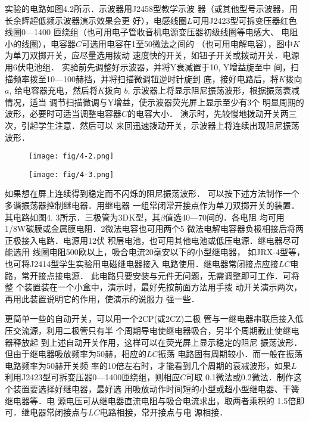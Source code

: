 实验的电路如图4.2所示．示波器用J2458型教学示波
器（或其他型号示波器，用长余辉超低频示波器演示效果会更
好），电感线圈$L$可用J2423型可拆变压器红色线圈0—1400
匝绕组（也可用电子管收音机电源变压器初级线圈等电感大、
电阻小的线圈），电容器$C$可选用电容在1至50微法之间的
（也可用电解电容），图中$K$为单刀双掷开关，应尽量选用拨动
速度快的开关，如钮子开关或拨动开关．电源用6伏电池组．
实验前先调整好示波器，并将Y衰减置于10, Y增益旋至中
间，扫描频率拨至10—100赫挡，并将扫描微调钮逆时针旋到
底，接好电路后，将$K$拨向$a$, 给电容器充电，然后将$K$拨向
$b$, 示波器上将显示阻尼振荡波形，根据振荡衰减情况，适当
调节扫描微调与Y增益，使示波器荧光屏上显示至少有3个
明显周期的波形，必要时可适当调整电容器$C$的电容大小．
演示时，先较慢地拨动开关两三次，引起学生注意．然后可以
来回迅速拨动开关，示波器上将连续出现阻尼振荡波形．

\begin{figure}[htp]\centering
    \begin{minipage}[t]{0.48\textwidth}
    \centering
\texttt{[image: fig/4-2.png]}
    \caption{}
    \end{minipage}
    \begin{minipage}[t]{0.48\textwidth}
    \centering
\texttt{[image: fig/4-3.png]}
    \caption{}
    \end{minipage}
    \end{figure}

如果想在屏上连续得到稳定而不闪烁的阻尼振荡波形．
可以按下述方法制作一个多谐振荡器控制继电器．用继电器
一组常闭常开接点作为单刀双掷开关的装置．其电路如图4.
3所示．三极管为3DK型，其$\beta$值选40—70间的．各电阻
均可用1/8W碳膜或金属膜电阻．2微法电容也可用两个5
微法电解电容器负极相接后将两正极接入电路．电源用12伏
积层电池，也可用其他电池或低压电源．继电器尽可能选用
线圈电阻500欧以上，吸合电流20毫安以下的小型继电器，
如JRX-4型等，也可将J2414型学生实验用电磁继电器接入
电路使用．继电器常闭接点应接$LC$电路，常开接点接电源．
此电路只要安装与元件无问题，无需调整即可工作．可将整
个装置装在一个小盒中，演示时，最好先按前面方法用手拨
动开关演示两次，再用此装置说明它的作用，使演示的说服力
强一些．

更简单一些的自动开关，可以用一个2CP(或2CZ)二极
管与一继电器串联后接入低压交流源，利用二极管只有半
个周期导电使继电器吸合，另半个周期截止使继电器释放起
到上述自动开关作用，这样可以在荧光屏上显示稳定的阻尼
振荡波形．但由于继电器吸放频率为50赫，相应的$LC$振荡
电路固有周期较小．而一般在振荡电路频率为50赫开关频
率的10倍左右时，才能看到几个周期的衰减波形，如果$L$
利用J2423型可拆变压器0—1400匝绕组，则相应$C$可取
0.1微法或0.2微法．制作这个装置要选择好继电器，最好选
用吸放动作时间短的小型或超小型继电器、干簧继电器等．电
源电压可从继电器直流电阻与吸合电流求出，取两者乘积的
1.5倍即可．继电器常闭接点与$LC$电路相接，常开接点与电
源相接．

